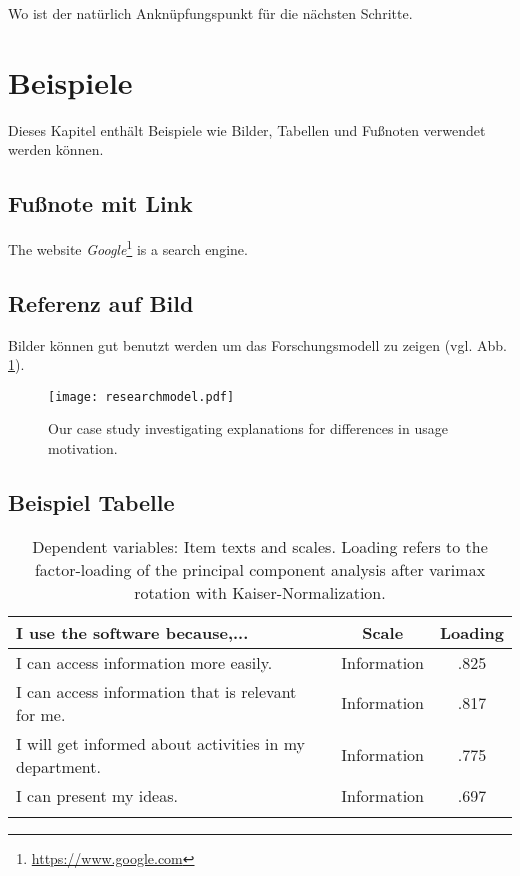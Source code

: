 Wo ist der natürlich Anknüpfungspunkt für die nächsten Schritte.




\newpage
\section{Beispiele}
Dieses Kapitel enthält Beispiele wie Bilder, Tabellen und Fußnoten verwendet werden können.

\subsection{Fußnote mit Link}

The website \textit{Google}\footnote{\url{https://www.google.com}} is a search engine. 


\subsection{Referenz auf Bild}
Bilder können gut benutzt werden um das Forschungsmodell zu zeigen (vgl. Abb. \ref{fig:researchmodel}).

\begin{figure}[htbp]
\centering
  \texttt{[image: researchmodel.pdf]}
   \caption{Our case study investigating explanations for differences in usage motivation.}
\label{fig:researchmodel}
\end{figure}

\subsection{Beispiel Tabelle}


\begin{table}[htbp]
\centering
	\begin{tabular}{p{7.7cm}p{0.5cm}cc}
	\toprule
	\textbf{I use the software because,...} &	&	\textbf{Scale} & Loading\\
	\midrule 
    I can access information more easily. & & Information & .825\\
    I can access information that is relevant for me.& & Information  & .817\\
    I will get informed about activities in my department. & & Information & .775 \\
    I can present my ideas. & & Information & .697 \\
	\bottomrule \\
\end{tabular}
\caption{Dependent variables: Item texts and scales. Loading refers to the factor-loading of the principal component analysis after varimax rotation with Kaiser-Normalization.}
\label{tab:ScalesMotives}
\end{table}

